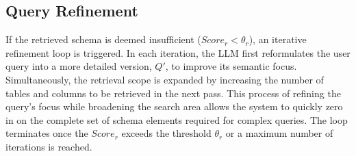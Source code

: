 \documentclass[runningheads]{llncs}
\begin{document}
\subsection{Query Refinement}
If the retrieved schema is deemed insufficient ($Score_r < \theta_r$), an iterative refinement loop is triggered. In each iteration, the LLM first reformulates the user query into a more detailed version, $Q'$, to improve its semantic focus. Simultaneously, the retrieval scope is expanded by increasing the number of tables and columns to be retrieved in the next pass. This process of refining the query's focus while broadening the search area allows the system to quickly zero in on the complete set of schema elements required for complex queries. The loop terminates once the $Score_r$ exceeds the threshold $\theta_r$ or a maximum number of iterations is reached.
\end{document}
